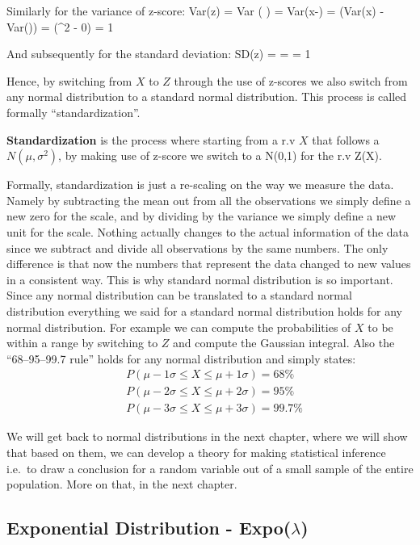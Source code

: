 Similarly for the variance of z-score:
\bse
Var(z) = Var \Big(  \Big) =  Var(x-\mu)
=  (Var(x) - Var(\mu)) =  (\sigma^2 - 0) = 1
\ese

And subsequently for the standard deviation:
\bse
SD(z) =  =  = 1
\ese

Hence, by switching from $X$ to $Z$ through the use of z-scores we also switch from any normal distribution to a
standard normal distribution. This process is called formally ``standardization''.

\bd[Standardization]
\textbf{Standardization} is the process where starting from a r.v $X$ that follows a $N(\mu, \sigma^2)$, by making
use of z-score we switch to a N(0,1) for the r.v Z(X).
\ed

Formally, standardization is just a re-scaling on the way we measure the data. Namely by subtracting the mean out
from all the observations we simply define a new zero for the scale, and by dividing by the variance we simply define
a new unit for the scale. Nothing actually changes to the actual information of the data since we subtract and divide
all observations by the same numbers. The only difference is that now the numbers that represent the data changed to
new values in a consistent way. This is why standard normal distribution is so important. Since any normal
distribution can be translated to a standard normal distribution everything we said for a standard normal
distribution holds for any normal distribution. For example we can compute the probabilities of $X$ to be within a
range by switching to $Z$ and compute the Gaussian integral. Also the ``68–95–99.7 rule'' holds for any normal
distribution and simply states:
\begin{align*}
& P(\mu -1\sigma \leq X\leq \mu +1\sigma ) = 68\% \\
& P(\mu -2\sigma \leq X\leq \mu +2\sigma ) = 95\% \\
& P(\mu -3\sigma \leq X\leq \mu +3\sigma ) = 99.7\%
\end{align*}

We will get back to normal distributions in the next chapter, where we will show that based on them, we can develop a
theory for making statistical inference i.e.\ to draw a conclusion for a random variable out of a small sample of the
entire population. More on that, in the next chapter.

\subsection{Exponential Distribution - Expo($\lambda$)}

